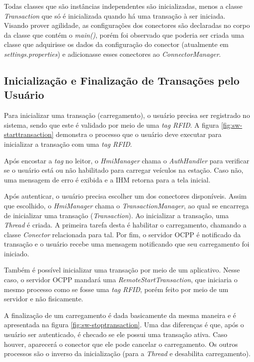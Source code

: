       Todas classes que são instâncias independentes são inicializadas, menos a classe \textit{Transaction} que só é inicializada quando há uma transação à ser iniciada. Visando prover agilidade, as configurações dos conectores são declaradas no corpo da classe que contém o \textit{main()}, porém foi observado que poderia ser criada uma classe que adquirisse os dados da configuração do conector (atualmente em \textit{settings.properties}) e adicionasse esses conectores ao \textit{ConnectorManager}.

    \subsection{Inicialização e Finalização de Transações pelo Usuário}

      Para inicializar uma transação (carregamento), o usuário precisa ser registrado no sistema, sendo que este é validado por meio de uma \textit{tag \ac{RFID}}. A figura \ref{fig:sw-starttransaction} demonstra o processo que o usuário deve executar para inicializar a transação com uma \textit{tag RFID}.

      Após encostar a \textit{tag} no leitor, o \textit{HmiManager} chama o \textit{AuthHandler} para verificar se o usuário está ou não habilitado para carregar veículos na estação. Caso não, uma mensagem de erro é exibida e a \ac{IHM} retorna para a tela inicial.

      Após autenticar, o usuário precisa escolher um dos conectores disponíveis. Assim que escolhido, o \textit{HmiManager} chama o \textit{TransactionManager}, ao qual se encarrega de inicializar uma transação (\textit{Transaction}). Ao inicializar a transação, uma \textit{Thread} é criada. A primeira tarefa desta é habilitar o carregamento, chamando a classe \textit{Conector} relacionada para tal. Por fim, o servidor \ac{OCPP} é notificado da transação e o usuário recebe uma mensagem notificando que seu carregamento foi iniciado.

      Também é possível inicializar uma transação por meio de um aplicativo. Nesse caso, o servidor OCPP mandará uma \textit{RemoteStartTransaction}, que iniciaria o mesmo processo como se fosse uma \textit{tag RFID}, porém feito por meio de um servidor e não fisicamente.

      A finalização de um carregamento é dada basicamente da mesma maneira e é apresentada na figura \ref{fig:sw-stoptransaction}. Uma das diferenças é que, após o usuário ser autenticado, é checado se ele possui uma transação ativa. Caso houver, aparecerá o conector que ele pode cancelar o carregamento. Os outros processos são o inverso da inicialização (para a \textit{Thread} e desabilita carregamento).

